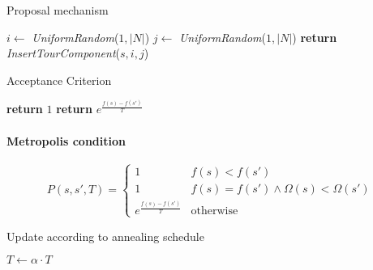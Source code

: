 \begin{homeworkProblem}
\begin{algorithm}
\caption{Proposal mechanism}
\label{SA:Prop}
\begin{algorithmic}
  \State $i \gets $ \emph{UniformRandom}($1,|N|$)
    \State $j \gets $ \emph{UniformRandom}($1,|N|$)
  \EndWhile  
  \State \textbf{return} \emph{InsertTourComponent}($s,i,j$)   
\EndProcedure
\end{algorithmic}
\end{algorithm}

\begin{algorithm}
\caption{Acceptance Criterion}
\label{saTSPTW}
\begin{algorithmic}
  \State \textbf{return} $1$
\Else
  \State \textbf{return} $e^{\frac{f(s)-f(s')}{T}}$
\EndIf
\EndProcedure
\end{algorithmic}
\end{algorithm}

\paragraph{Metropolis condition}
\begin{equation} \label{eq:metropolis}
  P(s,s',T) = \begin{cases}
               1 & f(s) < f(s') \\
               1 & f(s) = f(s') \wedge \Omega(s) < \Omega(s')\\
               e^{\frac{f(s)-f(s')}{T}} & \text{otherwise}
              \end{cases}
\end{equation}

\begin{algorithm}
\caption{Update according to annealing schedule}
\label{saTSPTW}
\begin{algorithmic}
  \State $T \gets \alpha \cdot T$
\EndProcedure
\end{algorithmic}
\end{algorithm}




\end{homeworkProblem}
